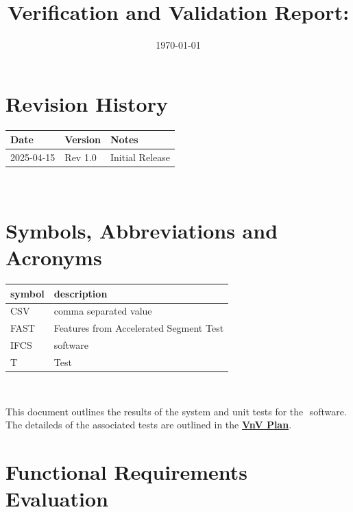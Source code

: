 \documentclass[12pt, titlepage]{article}
\begin{document}
\title{Verification and Validation Report: \progname} 
\author{\authname}
\date{\today}
	
\maketitle


\section{Revision History}

\begin{tabularx}{\textwidth}{p{3cm}p{2cm}X}
\toprule {\bf Date} & {\bf Version} & {\bf Notes}\\
\midrule
2025-04-15 & Rev 1.0 & Initial Release\\
\bottomrule
\end{tabularx}

~\newpage

\section{Symbols, Abbreviations and Acronyms}

\renewcommand{\arraystretch}{1.2}
\begin{tabular}{l l} 
  \toprule		
  \textbf{symbol} & \textbf{description}\\
  \midrule 
  CSV & comma separated value \\
  FAST & Features from Accelerated Segment Test \\
  IFCS & \progname{} software\\
  T & Test\\
  \bottomrule
\end{tabular}\\


\newpage

\tableofcontents

\listoftables %

\listoffigures %

\newpage


This document outlines the results of the system and unit tests for the \progname  $ $ software. The detaileds of the associated tests are outlined in the \href{https://github.com/KiranSingh15/CAS-741-Image-Correspondences/blob/main/docs/VnVPlan/VnVPlan.pdf}{\textbf{VnV Plan}}.
\section{Functional Requirements Evaluation}
\end{document}
